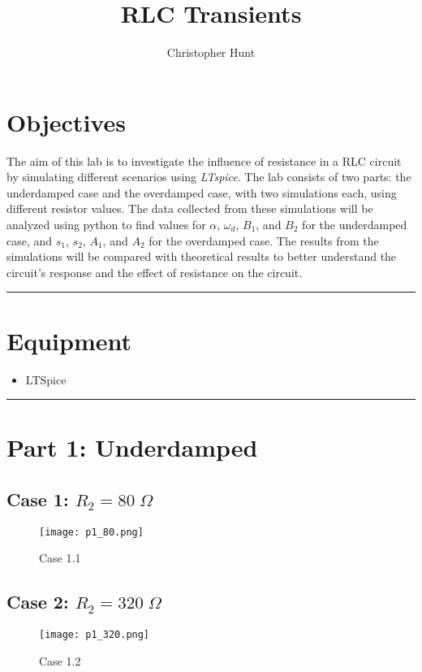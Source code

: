 \documentclass[11pt]{article}
\title{\textbf{{\huge RLC Transients}}}
\author{Christopher Hunt}
\date{}
\begin{document}
\pagestyle{fancy}
\fancyhf{}
\rhead{\thepage}
\maketitle
\section*{\textcolor{mycolor}{Objectives}}
The aim of this lab is to investigate the influence of resistance in a RLC circuit by simulating different scenarios using \textit{LTspice}. The lab consists of two parts: the underdamped case and the overdamped case, with two simulations each, using different resistor values. The data collected from these simulations will be analyzed using python to find values for $\alpha$, $\omega_d$, $B_1$, and $B_2$ for the underdamped case, and $s_1$, $s_2$, $A_1$, and $A_2$ for the overdamped case. The results from the simulations will be compared with theoretical results to better understand the circuit's response and the effect of resistance on the circuit.
\vspace{5mm}
\hrule

\section*{\textcolor{mycolor}{Equipment}}
\begin{itemize}
  \item LTSpice
\end{itemize}

\vspace{5mm}
\hrule

\section*{\textcolor{mycolor}{Part 1: Underdamped}}
\subsection*{\textcolor{mycolor}{Case 1: $R_2=80\;\Omega$}}
\begin{figure}[H]
  \centering
  \texttt{[image: p1\_80.png]}
  \caption{Case 1.1}
  \label{fig:1}
\end{figure}
\subsection*{\textcolor{mycolor}{Case 2: $R_2=320\;\Omega$}}
\begin{figure}[H]
  \centering
  \texttt{[image: p1\_320.png]}
  \caption{Case 1.2}
  \label{fig:2}
\end{figure}
\end{document}
